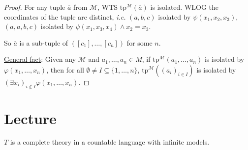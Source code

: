 \documentclass[]{article}
\theoremstyle{custhm}
\theoremstyle{cusdef}
\theoremstyle{custhm}
\theoremstyle{custhm}
\theoremstyle{custhm}
\theoremstyle{ex}
\theoremstyle{custhm}
\theoremstyle{cusdef}
\theoremstyle{remark}
\theoremstyle{remark}
\renewcommand{\it}[1]{\textit{#1}}
\newcommand{\M}{\mathcal{M}}
\renewcommand{\phi}{\varphi}
\renewcommand{\bar}{\overline}
\newcommand{\tp}{\textrm{tp}}
\renewcommand{\subset}{\subseteq}
\begin{document}
\begin{proof}
For any tuple $\bar{a}$ from $\M$, WTS $\tp^\M(\bar{a})$ is isolated. WLOG the coordinates of the tuple are distinct, \it{i.e.} $(a,b,c)$ isolated by $\psi(x_1,x_2,x_3)$, $(a,a,b,c)$ isolated by $\psi(x_1,x_3,x_4)\land x_2 = x_3$.

So $\bar{a}$ is a sub-tuple of $([c_1],\dots,[c_n])$ for some $n$.

\underline{General fact}: Given any $\M$ and $a_1,\dots,a_n\in M$, if $\tp^\M(a_1,\dots,a_n)$ is isolated by $\phi(x_1,\dots,x_n)$, then for all $\emptyset\ne I\subset \{1,\dots,n\}$, $\tp^\M((a_i)_{i\in I})$ is isolated by $(\exists x_i)_{i\not\in I}\phi(x_1,\dots,x_n)$.
\end{proof}

\section{Lecture}
$T$ is a complete theory in a countable language with infinite models.
\end{document}
